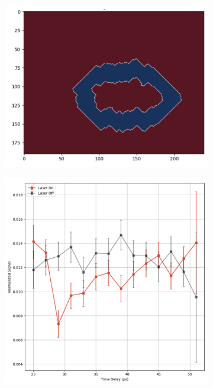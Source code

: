 \documentclass{article}
\begin{document}
\begin{figure}[htbp]
    \vspace{0.5cm}  %
    
    \begin{subfigure}{0.45\textwidth}
        \centering
        \includegraphics[width=\textwidth]{mask.png}
        \caption{}
        \label{fig:mask}
    \end{subfigure}
    \hfill  %
    \begin{subfigure}{0.45\textwidth}
        \centering
        \includegraphics[width=\textwidth]{delaycurves.png}
        \caption{}
        \label{fig:delaycurves}
    \end{subfigure}
    

\end{figure}
\end{document}
